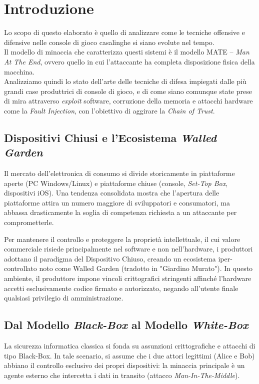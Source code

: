 \section{Introduzione}
Lo scopo di questo elaborato è quello di analizzare come le tecniche offensive e difensive nelle console di gioco casalinghe si siano evolute nel tempo.\\
Il modello di minaccia che caratterizza questi sistemi è il modello MATE -- \textit{Man At The End}, ovvero quello in cui l'attaccante ha completa disposizione fisica della macchina.\\
Analizziamo quindi lo stato dell'arte delle tecniche di difesa impiegati dalle più grandi case produttrici di console di gioco, e di come siano comunque state prese di mira attraverso \textit{exploit} software, corruzione della memoria e attacchi hardware come la \textit{Fault Injection}, con l'obiettivo di aggirare la \textit{Chain of Trust}.

\subsection{Dispositivi Chiusi e l'Ecosistema \textit{Walled Garden}}

Il mercato dell'elettronica di consumo si divide storicamente in piattaforme aperte (PC Windows/Linux) e piattaforme chiuse (console, \textit{Set-Top Box}, dispositivi iOS). Una tendenza consolidata mostra che l'apertura delle piattaforme attira un numero maggiore di sviluppatori e consumatori, ma abbassa drasticamente la soglia di competenza richiesta a un attaccante per comprometterle.

Per mantenere il controllo e proteggere la proprietà intellettuale, il cui valore commerciale risiede principalmente nel software e non nell'hardware, i produttori adottano il paradigma del Dispositivo Chiuso, creando un ecosistema iper-controllato noto come Walled Garden (tradotto in "Giardino Murato"). In questo ambiente, il produttore impone vincoli crittografici stringenti affinché l'hardware accetti esclusivamente codice firmato e autorizzato, negando all'utente finale qualsiasi privilegio di amministrazione.

\subsection{Dal Modello \textit{Black-Box} al Modello \textit{White-Box}}

La sicurezza informatica classica si fonda su assunzioni crittografiche e attacchi di tipo Black-Box. In tale scenario, si assume che i due attori legittimi (Alice e Bob) abbiano il controllo esclusivo dei propri dispositivi: la minaccia principale è un agente esterno che intercetta i dati in transito (attacco \textit{Man-In-The-Middle}).

